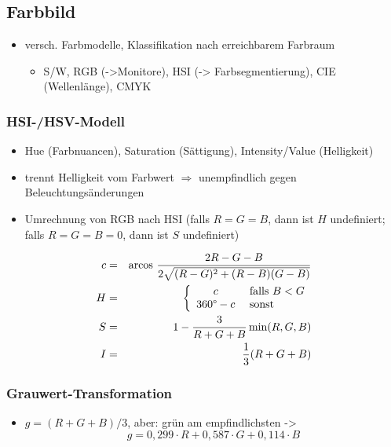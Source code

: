 \subsection{Farbbild}
\begin{itemize}
\item versch. Farbmodelle, Klassifikation nach erreichbarem Farbraum
\begin{itemize}
\item S/W, RGB (->Monitore), HSI (-> Farbsegmentierung), CIE (Wellenlänge), CMYK
\end{itemize}
\end{itemize}

\subsubsection{HSI-/HSV-Modell}

\begin{itemize}
\item Hue (Farbnuancen), Saturation (Sättigung), Intensity/Value (Helligkeit)
\item trennt Helligkeit vom Farbwert $\Rightarrow$ unempfindlich gegen Beleuchtungsänderungen
\item Umrechnung von RGB nach HSI (falls $R=G=B$, dann ist $H$ undefiniert; falls $R=G=B=0$, dann ist $S$ undefiniert)
\end{itemize}
\begin{eqnarray*}
c &=& \textrm{arcos } \frac{2R - G - B}{2 \sqrt{(R-G)^2 + (R-B)(G-B)}} \\
H &=& \left\{ \begin{array}{cl} c & \textrm{ falls } B < G \\ 360\degree - c & \textrm{ sonst} \end{array} \right. \\
S &=& 1 - \frac{3}{R+G+B} \min (R,G,B) \\
I &=& \frac{1}{3} (R + G + B)
\end{eqnarray*}

\subsubsection{Grauwert-Transformation}

\begin{itemize}
\item $g = (R+G+B)/3$, aber: grün am empfindlichsten -> $$g = 0,299 \cdot R + 0,587 \cdot G + 0,114 \cdot B$$
\end{itemize}

